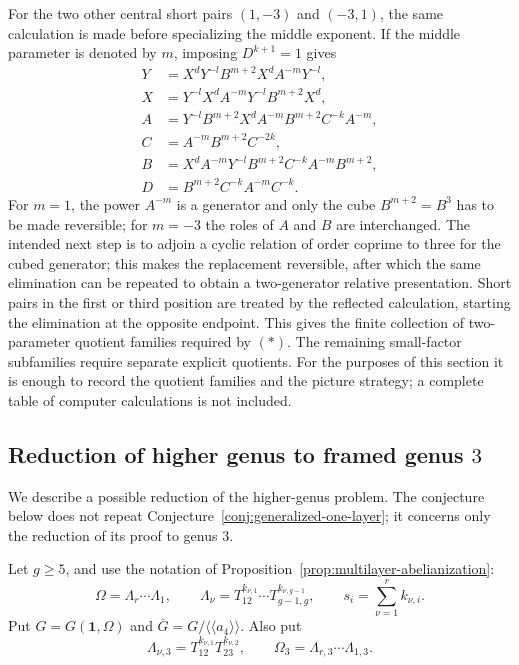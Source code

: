 \documentclass{article}
\begin{document}
For the two other central short pairs $(1,-3)$ and $(-3,1)$, the same
calculation is made before specializing the middle exponent.  If the middle
parameter is denoted by $m$, imposing $D^{k+1}=1$ gives
\[
\begin{aligned}
Y&=X^dY^{-l}B^{m+2}X^dA^{-m}Y^{-l},\\
X&=Y^{-l}X^dA^{-m}Y^{-l}B^{m+2}X^d,\\
A&=Y^{-l}B^{m+2}X^dA^{-m}B^{m+2}C^{-k}A^{-m},\\
C&=A^{-m}B^{m+2}C^{-2k},\\
B&=X^dA^{-m}Y^{-l}B^{m+2}C^{-k}A^{-m}B^{m+2},\\
D&=B^{m+2}C^{-k}A^{-m}C^{-k}.
\end{aligned}
\]
For $m=1$, the power $A^{-m}$ is a generator and only the cube
$B^{m+2}=B^3$ has to be made reversible; for $m=-3$ the roles of $A$ and
$B$ are interchanged.  The intended next step is to adjoin a cyclic relation of order coprime to
three for the cubed generator; this makes the replacement reversible, after
which the same elimination can be repeated to obtain a two-generator relative
presentation.  Short pairs in
the first or third position are treated by the reflected calculation,
starting the elimination at the opposite endpoint.  This gives the finite
collection of two-parameter quotient families required by \((*)\).
 The remaining small-factor subfamilies require separate explicit quotients.
For the purposes of this section it is enough to record the quotient families
and the picture strategy; a complete table of computer calculations is not
included.
\subsection{Reduction of higher genus to framed genus $3$}
\label{subsec:two-layers-large-genus}

We describe a possible reduction of the higher-genus problem.  The
conjecture below does not repeat
Conjecture~\ref{conj:generalized-one-layer}; it concerns only the reduction
of its proof to genus $3$.

Let $g\geq5$, and use the notation of
Proposition~\ref{prop:multilayer-abelianization}:
\[
 \Omega=\Lambda_r\cdots\Lambda_1,
 \qquad
 \Lambda_\nu=T_{12}^{k_{\nu,1}}\cdots
 T_{g-1,g}^{k_{\nu,g-1}},
 \qquad
 s_i=\sum_{\nu=1}^r k_{\nu,i}.
\]
Put $G=G(\mathbf 1,\Omega)$ and
$\overline G=G/\langle\!\langle a_4\rangle\!\rangle$.  Also put
\[
 \Lambda_{\nu,3}=T_{12}^{k_{\nu,1}}T_{23}^{k_{\nu,2}},
 \qquad
 \Omega_3=\Lambda_{r,3}\cdots\Lambda_{1,3}.
\]
\end{document}
